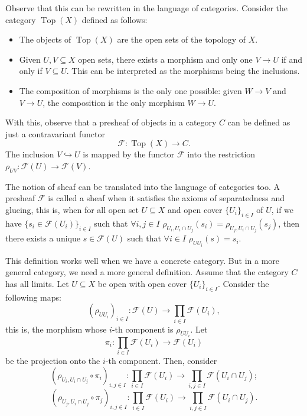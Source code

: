 \documentclass{report}
\DeclareMathOperator{\Top}{Top}
\theoremstyle{definition}
\begin{document}
Observe that this can be rewritten in the language of categories. Consider the category $\Top(X)$ defined as follows:
\begin{itemize}
\item The objects of $\Top(X)$ are the open sets of the topology of $X$.

\item Given $U,V\subseteq X$ open sets, there exists a morphism and only one $V\rightarrow U$ if and only if $V\subseteq U$. This can be interpreted as the morphisms being the inclusions.

\item The composition of morphisms is the only one possible: given $W\rightarrow V$ and $V\rightarrow U$, the composition is the only morphism $W\rightarrow U$.
\end{itemize}

With this, observe that a presheaf of objects in a category $C$ can be defined as just a contravariant functor
\[\mathcal{F}:\Top(X)\rightarrow C.\]
The inclusion $V\hookrightarrow U$ is mapped by the functor $\mathcal{F}$ into the restriction $\rho_{UV}:\mathcal{F}(U)\rightarrow\mathcal{F}(V)$.
\vspace{2mm}

The notion of sheaf can be translated into the language of categories too. A presheaf $\mathcal{F}$ is called a sheaf when it satisfies the axioms of separatedness and glueing, this is, when for all open set $U\subseteq X$ and open cover $\{U_i\}_{i\in I}$ of $U$, if we have $\{s_i\in\mathcal{F}(U_i)\}_{i\in I}$ such that $\forall i,j\in I$ $\rho_{U_i,U_i\cap U_j}(s_i)=\rho_{U_j,U_i\cap U_j}(s_j)$, then there exists a unique $s\in\mathcal{F}(U)$ such that $\forall i\in I$ $\rho_{UU_i}(s)=s_i$.

This definition works well when we have a concrete category. But in a more general category, we need a more general definition. Assume that the category $C$ has all limits. Let $U\subseteq X$ be open with open cover $\{U_i\}_{i\in I}$. Consider the following maps:
\[(\rho_{UU_i})_{i\in I}:\mathcal{F}(U)\longrightarrow\prod_{i\in I}\mathcal{F}(U_i),\]
this is, the morphism whose $i$-th component is $\rho_{UU_i}$.
Let
\[\pi_i:\prod_{i\in I}\mathcal{F}(U_i)\longrightarrow\mathcal{F}(U_i)\]
be the projection onto the $i$-th component. Then, consider
\[(\rho_{U_i,U_i\cap U_j}\circ\pi_i)_{i,j\in I}:\prod_{i\in I}\mathcal{F}(U_i)\longrightarrow\prod_{i,j\in I}\mathcal{F}(U_i\cap U_j);\]
\[(\rho_{U_j,U_i\cap U_j}\circ\pi_j)_{i,j\in I}:\prod_{i\in I}\mathcal{F}(U_i)\longrightarrow\prod_{i,j\in I}\mathcal{F}(U_i\cap U_j).\]
\end{document}
